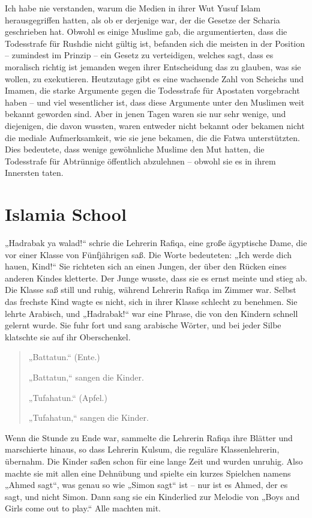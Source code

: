 \documentclass[12pt]{memoir}
\begin{document}
Ich habe nie verstanden,
warum die Medien in ihrer Wut Yusuf Islam herausgegriffen hatten,
als ob er derjenige war, der die Gesetze der Scharia geschrieben hat.
Obwohl es einige Muslime gab, die argumentierten,
dass die Todesstrafe für Rushdie nicht gültig ist,
befanden sich die meisten in der Position  –
zumindest im Prinzip – ein Gesetz zu verteidigen,
welches sagt, dass es moralisch richtig ist jemanden
wegen ihrer Entscheidung das zu glauben, was sie wollen, zu exekutieren.
Heutzutage gibt es eine wachsende Zahl von Scheichs und Imamen,
die starke Argumente gegen die Todesstrafe für Apostaten vorgebracht haben –
und viel wesentlicher ist, dass diese Argumente
unter den Muslimen weit bekannt geworden sind.
Aber in jenen Tagen waren sie nur sehr wenige, und diejenigen,
die davon wussten, waren entweder nicht bekannt
oder bekamen nicht die mediale Aufmerksamkeit,
wie sie jene bekamen, die die Fatwa unterstützten.
Dies bedeutete, dass wenige gewöhnliche Muslime den Mut hatten,
die Todesstrafe für Abtrünnige öffentlich abzulehnen –
obwohl sie es in ihrem Innersten taten.


\chapter{Islamia School}

„Hadrabak ya walad!“ schrie die Lehrerin Rafiqa,
eine große ägyptische Dame, die vor einer Klasse von Fünfjährigen saß.
Die Worte bedeuteten: „Ich werde dich hauen, Kind!“
Sie richteten sich an einen Jungen,
der über den Rücken eines anderen Kindes kletterte.
Der Junge wusste, dass sie es ernst meinte und stieg ab.
Die Klasse saß still und ruhig, während Lehrerin Rafiqa im Zimmer war.
Selbst das frechste Kind wagte es nicht,
sich in ihrer Klasse schlecht zu benehmen.
Sie lehrte Arabisch, und „Hadrabak!“
war eine Phrase, die von den Kindern schnell gelernt wurde.
Sie fuhr fort und sang arabische Wörter,
und bei jeder Silbe klatschte sie auf ihr Oberschenkel.

\begin{quote}
„Battatun.“ (Ente.)

„Battatun,“ sangen die Kinder.

„Tufahatun.“ (Apfel.)

„Tufahatun,“ sangen die Kinder.
\end{quote}

Wenn die Stunde zu Ende war,
sammelte die Lehrerin Rafiqa ihre Blätter und marschierte hinaus,
so dass Lehrerin Kulsum, die reguläre Klassenlehrerin, übernahm.
Die Kinder saßen schon für eine lange Zeit und wurden unruhig.
Also machte sie mit allen eine Dehnübung
und spielte ein kurzes Spielchen namens „Ahmed sagt“,
was genau so wie „Simon sagt“ ist –
nur ist es Ahmed, der es sagt, und nicht Simon.
Dann sang sie ein Kinderlied zur Melodie von
„Boys and Girls come out to play.“
Alle machten mit.
\end{document}
